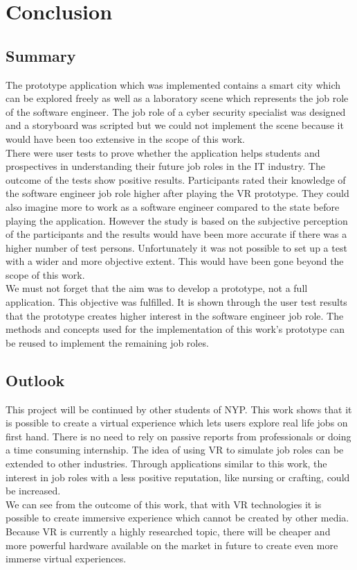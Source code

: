 \chapter{Conclusion} \label{conclusion}
\section{Summary}
The prototype application which was implemented contains a smart city which can be explored freely as well as a laboratory scene which represents the job role of the software engineer. The job role of a cyber security specialist was designed and a storyboard was scripted but we could not implement the scene because it would have been too extensive in the scope of this work. \\
There were user tests to prove whether the application helps students and prospectives in understanding their future job roles in the IT industry. The outcome of the tests show positive results. Participants rated their knowledge of the software engineer job role higher after playing the VR prototype. They could also imagine more to work as a software engineer compared to the state before playing the application. However the study is based on the subjective perception of the participants and the results would have been more accurate if there was a higher number of test persons. Unfortunately it was not possible to set up a test with a wider and more objective extent. This would have been gone beyond the scope of this work.\\
We must not forget that the aim was to develop a prototype, not a full application. This objective was fulfilled. It is shown through the user test results that the prototype creates higher interest in the software engineer job role. The methods and concepts used for the implementation of this work's prototype can be reused to implement the remaining job roles.

\section{Outlook}
This project will be continued by other students of NYP. 
This work shows that it is possible to create a virtual experience which lets users explore real life jobs on first hand. There is no need to rely on passive reports from professionals or doing a time consuming internship.  The idea of using VR to simulate job roles can be extended to other industries. Through applications similar to this work, the interest in job roles with a less positive reputation,  like nursing or crafting, could be increased.\\
We can see from the outcome of this work, that with VR technologies it is possible to create immersive experience which cannot be created by other media. Because VR is currently a highly researched topic, there will be cheaper and more powerful hardware available on the market in future to create even more immerse virtual experiences.
